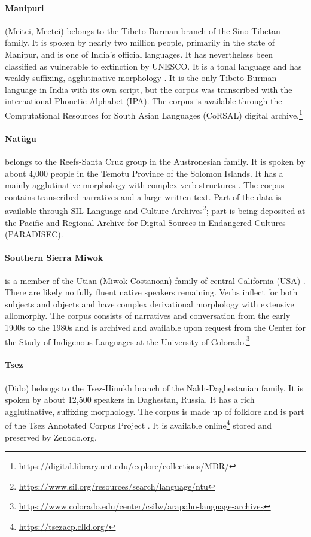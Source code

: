 \paragraph{Manipuri} 
(Meitei, Meetei) belongs to the Tibeto-Burman branch of the Sino-Tibetan family. It is spoken by nearly two million people, primarily in the state of Manipur, and is one of India's official languages. It has nevertheless been classified as vulnerable to extinction by UNESCO. It is a tonal language and has weakly suffixing, agglutinative morphology \citep{Chelliah-1997}. It is the only Tibeto-Burman language in India with its own script, but the corpus was transcribed with the international Phonetic Alphabet (IPA). The corpus is available through the Computational Resources for South Asian Languages (CoRSAL) digital archive.\footnote{\url{https://digital.library.unt.edu/explore/collections/MDR/}}

\paragraph{Natügu}
belongs to the Reefs-Santa Cruz group in the Austronesian family. It is spoken by about 4,000 people in the Temotu Province of the Solomon Islands. It has a mainly agglutinative morphology with complex verb structures \citep{naess_ntu_2008}. The corpus contains transcribed narratives and a large written text. Part of the data is available through SIL Language and Culture Archives\footnote{\url{https://www.sil.org/resources/search/language/ntu}}; part is being deposited at the Pacific and Regional Archive for Digital Sources in Endangered Cultures (PARADISEC).

\paragraph{Southern Sierra Miwok} 
is a member of the Utian (Miwok-Costanoan) family of central California (USA) \citep{broadbent_southern_1964}. There are likely no fully fluent native speakers remaining. Verbs inflect for both subjects and objects and have complex derivational morphology with extensive allomorphy. The corpus consists of narratives and conversation from the early 1900s to the 1980s and is archived and available upon request from the Center for the Study of Indigenous Languages at the University of Colorado.\footnote{\url{https://www.colorado.edu/center/csilw/arapaho-language-archives}}

\paragraph{Tsez}
(Dido) belongs to the Tsez-Hinukh branch of the Nakh-Daghestanian family. It is spoken by about 12,500 speakers in Daghestan, Russia. It has a rich agglutinative, suffixing morphology. The corpus is made up of folklore and is part of the Tsez Annotated Corpus Project \citep{abdulaev-tsezcorpus-2010}. It is available online\footnote{\url{https://tsezacp.clld.org/}} stored and preserved by Zenodo.org.


